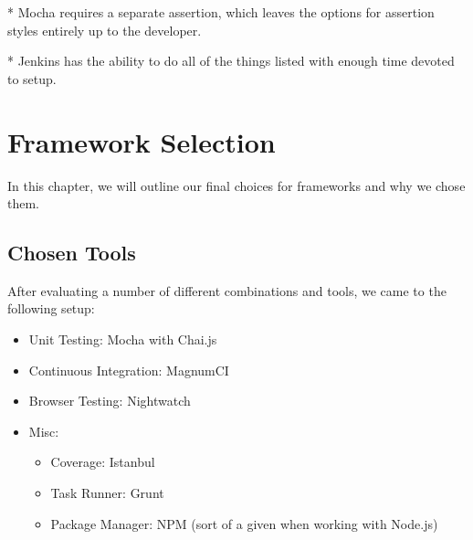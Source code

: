 \documentclass[12pt]{ucthesis}
\begin{document}
* Mocha requires a separate assertion, which leaves the options for assertion styles entirely up to the developer.

\FloatBarrier
\begin{table}[ht]
\end{table}
\FloatBarrier

* Jenkins has the ability to do all of the things listed with enough time devoted to setup.

\normalsize
\chapter{Framework Selection}
In this chapter, we will outline our final choices for frameworks and why we chose them.

\section{Chosen Tools}
After evaluating a number of different combinations and tools, we came to the following setup:
\begin{itemize}
  \item Unit Testing: Mocha with Chai.js
  \item Continuous Integration: MagnumCI
  \item Browser Testing: Nightwatch
  \item Misc:
    \begin{itemize}
      \item Coverage: Istanbul
      \item Task Runner: Grunt
      \item Package Manager: NPM (sort of a given when working with Node.js)
    \end{itemize}
\end{itemize}
\end{document}
